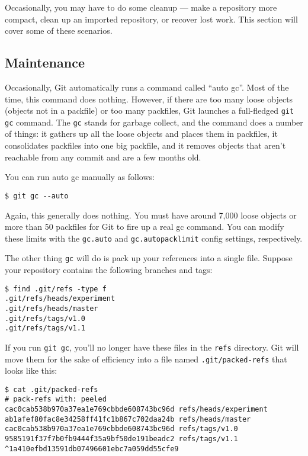 \documentclass[a4paper]{book}
\begin{document}
Occasionally, you may have to do some cleanup --- make a repository more compact, clean up an imported repository, or recover lost work. This section will cover some of these scenarios.

\subsection{Maintenance}\label{maintenance}

Occasionally, Git automatically runs a command called “auto gc”. Most of the time, this command does nothing. However, if there are too many loose objects (objects not in a packfile) or too many packfiles, Git launches a full-fledged \texttt{git gc} command. The \texttt{gc} stands for garbage collect, and the command does a number of things: it gathers up all the loose objects and places them in packfiles, it consolidates packfiles into one big packfile, and it removes objects that aren't reachable from any commit and are a few months old.

You can run auto gc manually as follows:

\begin{shaded}\begin{verbatim}
$ git gc --auto
\end{verbatim}\end{shaded}

Again, this generally does nothing. You must have around 7,000 loose objects or more than 50 packfiles for Git to fire up a real gc command. You can modify these limits with the \texttt{gc.auto} and \texttt{gc.autopacklimit} config settings, respectively.

The other thing \texttt{gc} will do is pack up your references into a single file. Suppose your repository contains the following branches and tags:

\begin{shaded}\begin{verbatim}
$ find .git/refs -type f
.git/refs/heads/experiment
.git/refs/heads/master
.git/refs/tags/v1.0
.git/refs/tags/v1.1
\end{verbatim}\end{shaded}

If you run \texttt{git gc}, you'll no longer have these files in the \texttt{refs} directory. Git will move them for the sake of efficiency into a file named \texttt{.git/packed-refs} that looks like this:

\begin{shaded}\begin{verbatim}
$ cat .git/packed-refs
# pack-refs with: peeled
cac0cab538b970a37ea1e769cbbde608743bc96d refs/heads/experiment
ab1afef80fac8e34258ff41fc1b867c702daa24b refs/heads/master
cac0cab538b970a37ea1e769cbbde608743bc96d refs/tags/v1.0
9585191f37f7b0fb9444f35a9bf50de191beadc2 refs/tags/v1.1
^1a410efbd13591db07496601ebc7a059dd55cfe9
\end{verbatim}\end{shaded}
\end{document}
